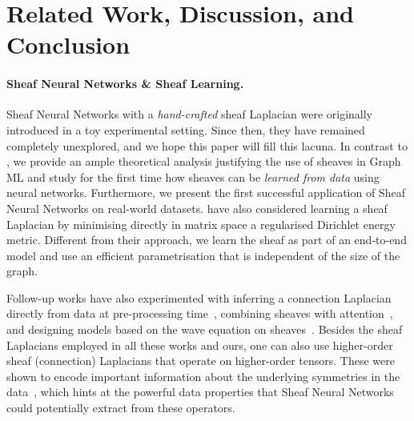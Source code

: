 \documentclass{article}
\begin{document}
\section{Related Work, Discussion, and Conclusion}

\paragraph{Sheaf Neural Networks \& Sheaf Learning.} Sheaf Neural Networks \citep{hansen2020sheaf} with a \emph{hand-crafted} sheaf Laplacian were originally introduced in a toy experimental setting. Since then, they have remained completely unexplored, and we hope this paper will fill this lacuna. In contrast to \citep{hansen2020sheaf}, we provide an ample theoretical analysis justifying the use of sheaves in Graph ML and study for the first time how sheaves can be {\em learned from data} using neural networks. Furthermore, we present the first successful application of Sheaf Neural Networks on real-world datasets. \citet{hansen2019learning} have also considered learning a sheaf Laplacian by minimising directly in matrix space a regularised Dirichlet energy metric. Different from their approach, we learn the sheaf as part of an end-to-end model and use an efficient parametrisation that is independent of the size of the graph. 

Follow-up works have also experimented with inferring a connection Laplacian directly from data at pre-processing time~\citep{barbero2022sheaf}, combining sheaves with attention~\citep{barbero2022sheaf_att}, and designing models based on the wave equation on sheaves~\citep{suk2022surfing}. Besides the sheaf Laplacians employed in all these works and ours, one can also use higher-order sheaf (connection) Laplacians that operate on higher-order tensors. These were shown to encode important information about the underlying symmetries in the data~\citep{pfau2020disentangling}, which hints at the powerful data properties that Sheaf Neural Networks could potentially extract from these operators. 
\end{document}
